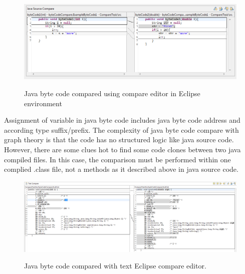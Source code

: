 \documentclass{report}
\begin{document}
\begin{figure}[h]
  \centering
  \includegraphics[scale = 0.55]{Figures/bytecode-compare/example-of-bytecode-text-compared}\\[0.1cm]
  \caption[Java byte code compared in Eclipse text compare editor]{Java byte code compared using compare editor in Eclipse environment}
  \label{fig:example-of-bytecode-text-compared}
\end{figure}

Assignment of variable in java byte code includes java byte code address and according type suffix/prefix. The complexity of java byte code compare with graph theory is that the code has no structured logic like java source code. However, there are some clues hot to find some code clones between two java compiled files. In this case, the comparison must be performed within one complied .class file, not a methods as it described above in java source code.

\begin{figure}[h]
  \centering
  \includegraphics[scale = 0.4]{Figures/bytecode-compare/example-of-bytecode-original-compared}\\[0.1cm]
  \caption[Java byte code compared with text Eclipse compare editor]{Java byte code compared with text Eclipse compare editor.}
  \label{fig:example-of-bytecode-original-compared}
\end{figure}
\end{document}
